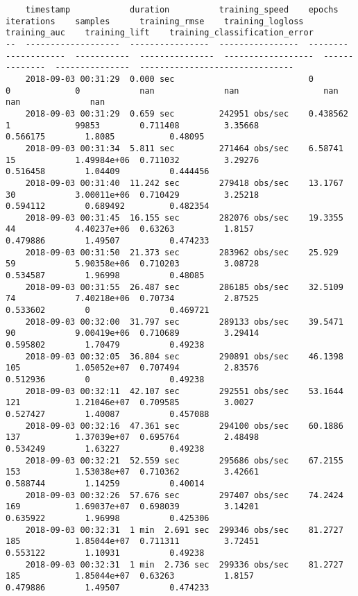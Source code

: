 \documentclass[11pt]{article}
\begin{document}
    
    \begin{verbatim}
    timestamp            duration          training_speed    epochs    iterations    samples      training_rmse    training_logloss    training_auc    training_lift    training_classification_error
--  -------------------  ----------------  ----------------  --------  ------------  -----------  ---------------  ------------------  --------------  ---------------  -------------------------------
    2018-09-03 00:31:29  0.000 sec                           0         0             0            nan              nan                 nan             nan              nan
    2018-09-03 00:31:29  0.659 sec         242951 obs/sec    0.438562  1             99853        0.711408         3.35668             0.566175        1.8085           0.48095
    2018-09-03 00:31:34  5.811 sec         271464 obs/sec    6.58741   15            1.49984e+06  0.711032         3.29276             0.516458        1.04409          0.444456
    2018-09-03 00:31:40  11.242 sec        279418 obs/sec    13.1767   30            3.00011e+06  0.710429         3.25218             0.594112        0.689492         0.482354
    2018-09-03 00:31:45  16.155 sec        282076 obs/sec    19.3355   44            4.40237e+06  0.63263          1.8157              0.479886        1.49507          0.474233
    2018-09-03 00:31:50  21.373 sec        283962 obs/sec    25.929    59            5.90358e+06  0.710203         3.08728             0.534587        1.96998          0.48085
    2018-09-03 00:31:55  26.487 sec        286185 obs/sec    32.5109   74            7.40218e+06  0.70734          2.87525             0.533602        0                0.469721
    2018-09-03 00:32:00  31.797 sec        289133 obs/sec    39.5471   90            9.00419e+06  0.710689         3.29414             0.595802        1.70479          0.49238
    2018-09-03 00:32:05  36.804 sec        290891 obs/sec    46.1398   105           1.05052e+07  0.707494         2.83576             0.512936        0                0.49238
    2018-09-03 00:32:11  42.107 sec        292551 obs/sec    53.1644   121           1.21046e+07  0.709585         3.0027              0.527427        1.40087          0.457088
    2018-09-03 00:32:16  47.361 sec        294100 obs/sec    60.1886   137           1.37039e+07  0.695764         2.48498             0.534249        1.63227          0.49238
    2018-09-03 00:32:21  52.559 sec        295686 obs/sec    67.2155   153           1.53038e+07  0.710362         3.42661             0.588744        1.14259          0.40014
    2018-09-03 00:32:26  57.676 sec        297407 obs/sec    74.2424   169           1.69037e+07  0.698039         3.14201             0.635922        1.96998          0.425306
    2018-09-03 00:32:31  1 min  2.691 sec  299346 obs/sec    81.2727   185           1.85044e+07  0.711311         3.72451             0.553122        1.10931          0.49238
    2018-09-03 00:32:31  1 min  2.736 sec  299336 obs/sec    81.2727   185           1.85044e+07  0.63263          1.8157              0.479886        1.49507          0.474233
    \end{verbatim}
\end{document}
